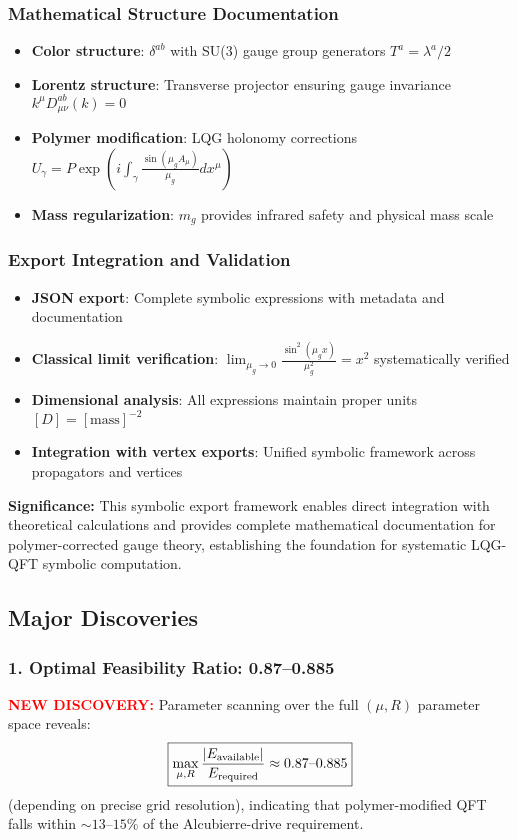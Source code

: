 \documentclass[11pt]{article}
\begin{document}
\subsubsection*{Mathematical Structure Documentation}
\begin{itemize}
  \item \textbf{Color structure}: $\delta^{ab}$ with SU(3) gauge group generators $T^a = \lambda^a/2$
  \item \textbf{Lorentz structure}: Transverse projector ensuring gauge invariance $k^\mu D^{ab}_{\mu\nu}(k) = 0$
  \item \textbf{Polymer modification}: LQG holonomy corrections $U_\gamma = P \exp(i \int_\gamma \frac{\sin(\mu_g A_\mu)}{\mu_g} dx^\mu)$
  \item \textbf{Mass regularization}: $m_g$ provides infrared safety and physical mass scale
\end{itemize}

\subsubsection*{Export Integration and Validation}
\begin{itemize}
  \item \textbf{JSON export}: Complete symbolic expressions with metadata and documentation
  \item \textbf{Classical limit verification}: $\lim_{\mu_g \to 0} \frac{\sin^2(\mu_g x)}{\mu_g^2} = x^2$ systematically verified
  \item \textbf{Dimensional analysis}: All expressions maintain proper units $[D] = [\text{mass}]^{-2}$
  \item \textbf{Integration with vertex exports}: Unified symbolic framework across propagators and vertices
\end{itemize}

\textbf{Significance:} This symbolic export framework enables direct integration with theoretical calculations and provides complete mathematical documentation for polymer-corrected gauge theory, establishing the foundation for systematic LQG-QFT symbolic computation.

\subsection*{Major Discoveries}

\subsubsection*{1. Optimal Feasibility Ratio: 0.87--0.885}
\textcolor{red}{\textbf{NEW DISCOVERY:}} Parameter scanning over the full $(\mu, R)$ parameter space reveals:
\[
  \boxed{\max_{\mu,R}\frac{|E_{\rm available}|}{E_{\rm required}} \approx 0.87\text{--}0.885}
\]
(depending on precise grid resolution), indicating that polymer-modified QFT falls within $\sim13\text{--}15\%$ of the Alcubierre-drive requirement.
\end{document}
